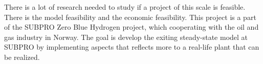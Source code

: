 There is a lot of research needed to study if a project of this scale is feasible. There is the model feasibility and the economic feasibility. This project is a part of the SUBPRO Zero Blue Hydrogen project, which cooperating with the oil and gas industry in Norway. The goal is develop the exiting steady-state model at SUBPRO by implementing aspects that reflects more to a real-life plant that can be realized. 